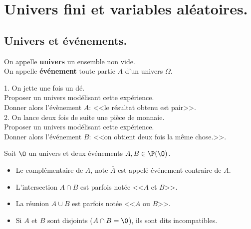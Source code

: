 \documentclass[11pt]{article}
\begin{document}


\section{Univers fini et variables aléatoires.}
\subsection{Univers et événements.}

\begin{nota}{}{}
    On appelle \textbf{univers} un ensemble non vide.\\
    On appelle \textbf{événement} toute partie $A$ d'un univers $\Omega$.
\end{nota}

\begin{ex}{}{}
    1. On jette une fois un dé.\\
    \indent Proposer un univers modélisant cette expérience.\\
    \indent Donner alors l'évènement $A$: <<le résultat obtenu est pair>>.\\
    2. On lance deux fois de suite une pièce de monnaie.\\
    \indent Proposer un univers modélisant cette expérience.\\
    \indent Donner alors l'événement $B$: <<on obtient deux fois la même chose.>>. 
\end{ex}

\begin{nota}{}{}
    Soit $\O$ un univers et deux événements $A,B\in\P(\O)$.
    \begin{itemize}[topsep=0pt,itemsep=-0.9 ex]
        \item Le complémentaire de $A$, note $\overline{A}$ est appelé événement contraire de $A$.
        \item L'intersection $A\cap B$ est parfois notée <<$A$ et $B$>>.
        \item La réunion $A\cup B$ est parfois notée <<$A$ ou $B$>>.
        \item Si $A$ et $B$ sont disjoints ($A\cap B = \0$), ils sont dits incompatibles.
    \end{itemize}
\end{nota}
\end{document}
